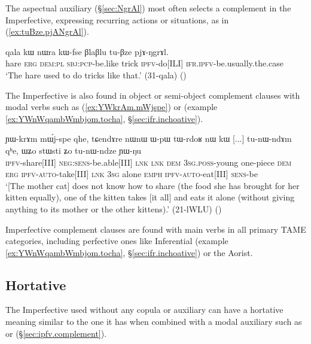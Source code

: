 The aspectual auxiliary  (§\ref{sec:NgrAl}) most often selects a complement in the Imperfective, expressing recurring actions or situations, as in (\ref{ex:tuBze.pjANgrAl}).

\begin{exe}
\ex \label{ex:tuBze.pjANgrAl}
\gll  qala kɯ nɯra kɯ-fse βlaβlu tu-βze pjɤ-ŋgrɤl. \\
hare \textsc{erg} \textsc{dem}:\textsc{pl} \textsc{sbj}:\textsc{pcp}-be.like trick \textsc{ipfv}-do[ILI] \textsc{ifr}.\textsc{ipfv}-be.usually.the.case \\
\glt `The hare used to do tricks like that.' (31-qala)
()
\end{exe}

The Imperfective is also found in object or semi-object complement clauses with modal verbs such as  (\ref{ex:YWkrAm.mWjspe}) or  (example \ref{ex:YWnWqambWmbjom.tocha}, §\ref{sec:ifr.inchoative}).

\begin{exe}
\ex \label{ex:YWkrAm.mWjspe}
\gll ɲɯ-krɤm mɯ́j-spe qhe, tɕendɤre nɯnɯ ɯ-pɯ tɯ-rdoʁ nɯ kɯ [...] tu-nɯ-ndɤm qʰe, ɯʑo stɯsti ʑo tu-nɯ-ndze ɲɯ-ŋu \\
\textsc{ipfv}-share[III] \textsc{neg}:\textsc{sens}-be.able[III] \textsc{lnk} \textsc{lnk} \textsc{dem} \textsc{3sg}.\textsc{poss}-young one-piece \textsc{dem} \textsc{erg} { } \textsc{ipfv}-\textsc{auto}-take[III] \textsc{lnk} \textsc{3sg} alone \textsc{emph} \textsc{ipfv}-\textsc{auto}-eat[III] \textsc{sens}-be \\
\glt `[The mother cat] does not know how to share (the food she has brought for her kitten equally), one of the kitten takes [it all] and eats it alone (without giving anything to its mother or the other kittens).' (21-lWLU)
()
\end{exe}

Imperfective complement clauses are found with main verbs in all primary TAME categories, including perfective ones like Inferential (example \ref{ex:YWnWqambWmbjom.tocha}, §\ref{sec:ifr.inchoative}) or the Aorist.


\subsection{Hortative} \label{sec:ipfv.hortative}
The Imperfective used without any copula or auxiliary can have a hortative meaning similar to the one it has when combined with a modal auxiliary such as  or  (§\ref{sec:ipfv.complement}). 

